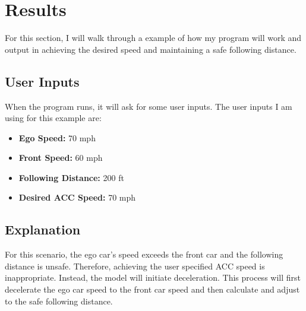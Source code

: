 \documentclass[12pt]{article}
\begin{document}
\section*{Results}
For this section, I will walk through a example of how my program will work and output in achieving the desired speed and maintaining a safe following distance. 
\subsection*{User Inputs}
When the program runs, it will ask for some user inputs. The user inputs I am using for this example are: 
\begin{itemize}
  \item \textbf{Ego Speed:} 70 mph
  \item \textbf{Front Speed:} 60 mph
  \item \textbf{Following Distance:} 200 ft
  \item \textbf{Desired ACC Speed:} 70 mph
\end{itemize}

\subsection*{Explanation}
For this scenario, the ego car's speed exceeds the front car and the following distance is unsafe. Therefore, achieving the user specified ACC speed is inappropriate. Instead, the model will initiate deceleration. This process will first decelerate the ego car speed to the front car speed and then calculate and adjust to the safe following distance. 
\end{document}
